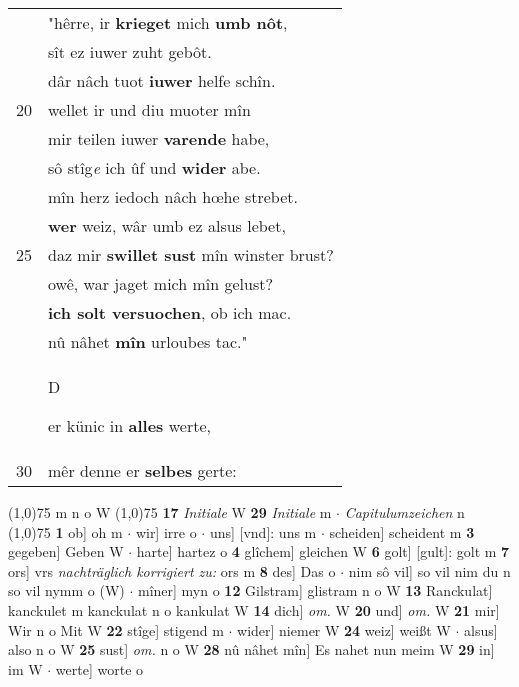 \documentclass[8pt,a4paper,notitlepage]{article}
\begin{document}
\begin{table}[ht]
\begin{minipage}[t]{0.5\linewidth}
\begin{tabular}{rl}
 & "hêrre, ir \textbf{krieget} mich \textbf{umb nôt},\\ 
 & sît ez iuwer zuht gebôt.\\ 
 & dâr nâch tuot \textbf{iuwer} helfe schîn.\\ 
20 & wellet ir und diu muoter mîn\\ 
 & mir teilen iuwer \textbf{varende} habe,\\ 
 & sô stîg\textit{e} ich ûf und \textbf{wider} abe.\\ 
 & mîn herz iedoch nâch hœhe strebet.\\ 
 & \textbf{wer} weiz, wâr umb ez alsus lebet,\\ 
25 & daz mir \textbf{swillet sust} mîn winster brust?\\ 
 & owê, war jaget mich mîn gelust?\\ 
 & \textbf{ich solt versuochen}, ob ich mac.\\ 
 & nû nâhet \textbf{mîn} urloubes tac."\\ 
 & \begin{large}D\end{large}er künic in \textbf{alles} werte,\\ 
30 & mêr denne er \textbf{selbes} gerte:\\ 
\end{tabular}
\scriptsize
\line(1,0){75} \newline
m n o W \newline
\line(1,0){75} \newline
\textbf{17} \textit{Initiale} W  \textbf{29} \textit{Initiale} m   $\cdot$ \textit{Capitulumzeichen} n  \newline
\line(1,0){75} \newline
\textbf{1} ob] oh m  $\cdot$ wir] irre o  $\cdot$ uns] [vnd]: uns m  $\cdot$ scheiden] scheident m \textbf{3} gegeben] Geben W  $\cdot$ harte] hartez o \textbf{4} glîchem] gleichen W \textbf{6} golt] [gult]: golt m \textbf{7} ors] vrs \textit{nachträglich korrigiert zu:} ors m \textbf{8} des] Das o  $\cdot$ nim sô vil] so vil nim du n so vil nymm o (W)  $\cdot$ mîner] myn o \textbf{12} Gilstram] glistram n o W \textbf{13} Ranckulat] kanckulet m kanckulat n o kankulat W \textbf{14} dich] \textit{om.} W \textbf{20} und] \textit{om.} W \textbf{21} mir] Wir n o Mit W \textbf{22} stîge] stigend m  $\cdot$ wider] niemer W \textbf{24} weiz] weißt W  $\cdot$ alsus] also n o W \textbf{25} sust] \textit{om.} n o W \textbf{28} nû nâhet mîn] Es nahet nun meim W \textbf{29} in] im W  $\cdot$ werte] worte o \newline
\end{minipage}
\end{table}
\end{document}
